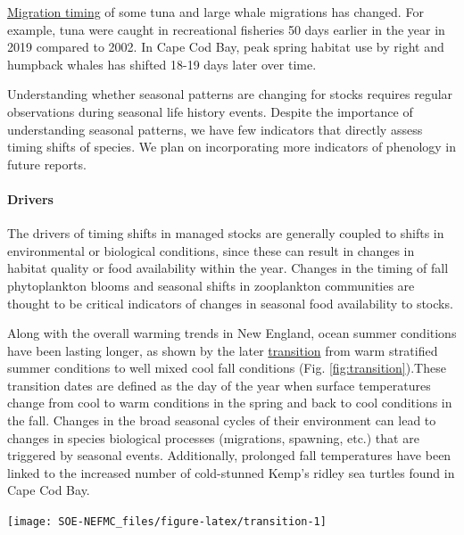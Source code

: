 \documentclass[
  10pt,
]{article}
\let\origfigure\figure
\let\endorigfigure\endfigure
\renewenvironment{figure}[1][2] {
    \expandafter\origfigure\expandafter[H]
} {
    \endorigfigure
}
\begin{document}
\href{https://noaa-edab.github.io/catalog/timing-shifts-risks-to-seasonal-management.html}{Migration timing} of some tuna and large whale migrations has changed. For example, tuna were caught in recreational fisheries 50 days earlier in the year in 2019 compared to 2002. In Cape Cod Bay, peak spring habitat use by right and humpback whales has shifted 18-19 days later over time.

Understanding whether seasonal patterns are changing for stocks requires regular observations during seasonal life history events. Despite the importance of understanding seasonal patterns, we have few indicators that directly assess timing shifts of species. We plan on incorporating more indicators of phenology in future reports.

\hypertarget{drivers-1}{%
\paragraph{Drivers}\label{drivers-1}}

The drivers of timing shifts in managed stocks are generally coupled to shifts in environmental or biological conditions, since these can result in changes in habitat quality or food availability within the year. Changes in the timing of fall phytoplankton blooms and seasonal shifts in zooplankton communities are thought to be critical indicators of changes in seasonal food availability to stocks.

Along with the overall warming trends in New England, ocean summer conditions have been lasting longer, as shown by the later \href{https://noaa-edab.github.io/catalog/transition-dates.html}{transition} from warm stratified summer conditions to well mixed cool fall conditions (Fig. \ref{fig:transition}).These transition dates are defined as the day of the year when surface temperatures change from cool to warm conditions in the spring and back to cool conditions in the fall. Changes in the broad seasonal cycles of their environment can lead to changes in species biological processes (migrations, spawning, etc.) that are triggered by seasonal events. Additionally, prolonged fall temperatures have been linked to the increased number of cold-stunned Kemp's ridley sea turtles found in Cape Cod Bay.

\begin{figure}

{\centering \texttt{[image: SOE-NEFMC\_files/figure-latex/transition-1]} 

}

\caption{Ocean summer length: the annual total number of days between the spring thermal transition date and the fall thermal transition date.}\label{fig:transition}
\end{figure}
\end{document}
